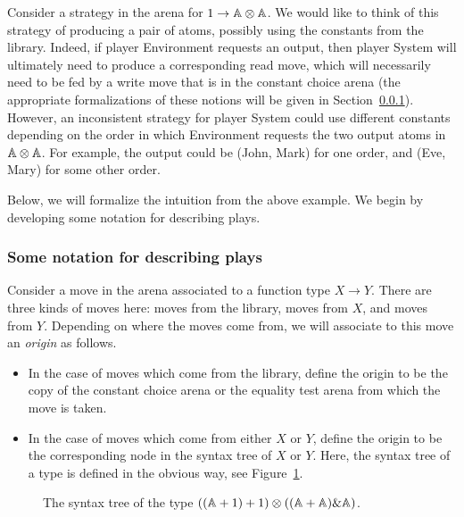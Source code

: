 \begin{example} \label{ex:inconsistent-strategy} Consider a strategy in the arena for  $1 \to \mathbb A \otimes \mathbb A$. We would like to think of this strategy of producing a pair of atoms, possibly using the constants from the library. Indeed, if player Environment requests an output, then player System will ultimately need to produce a corresponding read move, which will necessarily need to be fed by a write move that is in the constant choice arena (the appropriate formalizations of these notions will be given in Section~\ref{sec:some-notation-for-describing-plays}). However, an inconsistent strategy for player System could use different constants depending on the order in which Environment requests the two output atoms in $\mathbb A \otimes \mathbb A$.  For example, the output could be (John, Mark) for one order, and (Eve, Mary) for some other order.  \exampleend
\end{example}

Below, we will formalize the intuition from the above example. We begin by developing some notation for describing plays.





\subsubsection{Some notation for describing plays}
\label{sec:some-notation-for-describing-plays}
Consider a move in the arena associated to a function type $X \to Y$. There are three kinds of moves here: moves from the library, moves from $X$, and moves from $Y$. Depending on where the moves come from, we will associate to this move an \emph{origin} as follows. 
\begin{itemize}
    \item In the case of moves which come from the library, define the  {origin} to be the copy of the constant choice arena or the equality test arena from which the move is taken.
    \item   In the case of moves which come from either $X$ or $Y$, define the origin to be the corresponding node in the syntax tree of $X$ or $Y$. Here, the syntax tree of a type is defined in the obvious way, see Figure~\ref{fig:syntax-tree}.
\end{itemize}


\begin{figure}
    \caption{\label{fig:syntax-tree} The syntax tree of the type $((\mathbb A +1) + 1) \otimes ((\mathbb A + \mathbb A) \& \mathbb A)$.}
\end{figure}


